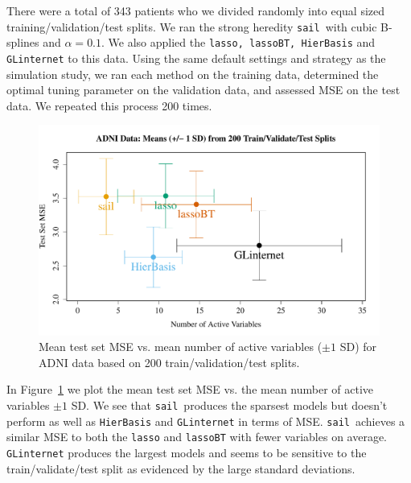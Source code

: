 \documentclass[12pt,letter]{article}\usepackage[]{graphicx}\usepackage[]{color}
\newenvironment{knitrout}{}{} %
\newcommand{\sail}{\texttt{sail}}
\begin{document}
There were a total of 343 patients who we divided randomly into equal sized training/validation/test splits. We ran the strong heredity \sail ~with cubic B-splines and $\alpha=0.1$. We also applied the \texttt{lasso, lassoBT, HierBasis} and \texttt{GLinternet} to this data. Using the same default settings and strategy as the simulation study, we ran each method on the training data, determined the optimal tuning parameter on the validation data, and assessed MSE on the test data. We repeated this process 200 times.





\begin{knitrout}\scriptsize
{}\color{fgcolor}\begin{figure}[H]

{\centering \includegraphics[width=1\linewidth]{figure/error-crosses-adni-1} 

}

\caption[Mean test set MSE vs]{Mean test set MSE vs. mean number of active variables ($\pm 1$ SD) for ADNI data based on 200 train/validation/test splits.}\label{fig:error-crosses-adni}
\end{figure}


\end{knitrout}

In Figure~\ref{fig:error-crosses-adni} we plot the mean test set MSE vs. the mean number of active variables $\pm 1$ SD. We see that \sail ~produces the sparsest models but doesn't perform as well as \texttt{HierBasis} and \texttt{GLinternet} in terms of MSE. \sail ~achieves a similar MSE to both the \texttt{lasso} and \texttt{lassoBT} with fewer variables on average. \texttt{GLinternet} produces the largest models and seems to be sensitive to the train/validate/test split as evidenced by the large standard deviations.
\end{document}
